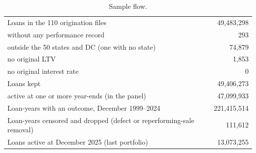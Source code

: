 \begin{table}[t]\centering\small
\caption{Sample flow.}\label{tab:flow}
\begin{tabular}{lr}\toprule
Loans in the 110 origination files & 49{,}483{,}298 \\
\quad without any performance record & 293 \\
\quad outside the 50 states and DC (one with no state) & 74{,}879 \\
\quad no original LTV & 1{,}853 \\
\quad no original interest rate & 0 \\
Loans kept & 49{,}406{,}273 \\
\quad active at one or more year-ends (in the panel) & 47{,}099{,}933 \\
Loan-years with an outcome{,} December 1999--2024 & 221{,}415{,}514 \\
Loan-years censored and dropped (defect or reperforming-sale removal) & 111{,}612 \\
Loans active at December 2025 (last portfolio) & 13{,}073{,}255 \\
\bottomrule\end{tabular}
\end{table}
